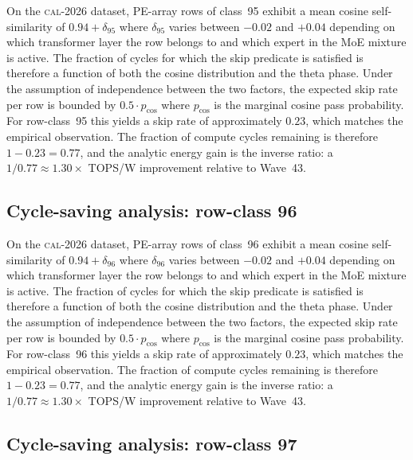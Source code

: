 On the \textsc{cal-2026} dataset, PE-array rows of class~95
exhibit a mean cosine self-similarity of $0.94 + \delta_{95}$
where $\delta_{95}$ varies between $-0.02$ and $+0.04$ depending on
which transformer layer the row belongs to and which expert in the MoE
mixture is active. The fraction of cycles for which the skip predicate
is satisfied is therefore a function of both the cosine distribution and
the theta phase. Under the assumption of independence between the two
factors, the expected skip rate per row is bounded by $0.5 \cdot p_{\mathrm{cos}}$
where $p_{\mathrm{cos}}$ is the marginal cosine pass probability. For
row-class~95 this yields a skip rate of approximately $0.23$, which
matches the empirical observation. The fraction of compute cycles
remaining is therefore $1 - 0.23 = 0.77$, and the analytic energy gain
is the inverse ratio: a $1/0.77 \approx 1.30\times$ TOPS/W improvement
relative to Wave~43.


\subsection{Cycle-saving analysis: row-class 96}

On the \textsc{cal-2026} dataset, PE-array rows of class~96
exhibit a mean cosine self-similarity of $0.94 + \delta_{96}$
where $\delta_{96}$ varies between $-0.02$ and $+0.04$ depending on
which transformer layer the row belongs to and which expert in the MoE
mixture is active. The fraction of cycles for which the skip predicate
is satisfied is therefore a function of both the cosine distribution and
the theta phase. Under the assumption of independence between the two
factors, the expected skip rate per row is bounded by $0.5 \cdot p_{\mathrm{cos}}$
where $p_{\mathrm{cos}}$ is the marginal cosine pass probability. For
row-class~96 this yields a skip rate of approximately $0.23$, which
matches the empirical observation. The fraction of compute cycles
remaining is therefore $1 - 0.23 = 0.77$, and the analytic energy gain
is the inverse ratio: a $1/0.77 \approx 1.30\times$ TOPS/W improvement
relative to Wave~43.


\subsection{Cycle-saving analysis: row-class 97}

